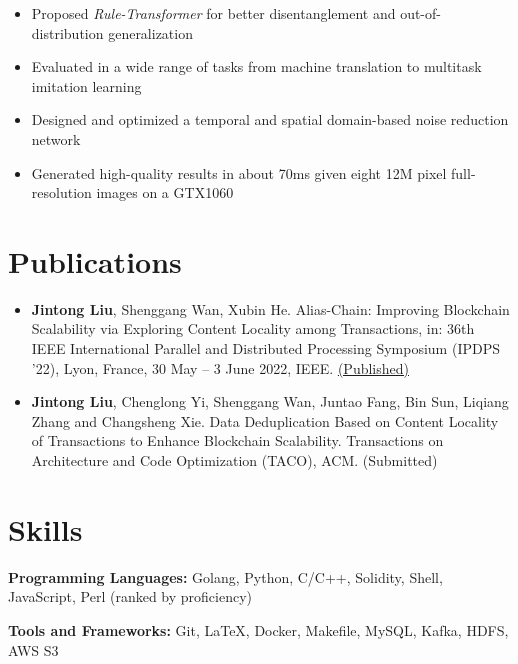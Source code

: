 \documentclass{resume}
\begin{document}
\begin{itemize}
    \item Proposed \textit{Rule-Transformer} for better disentanglement and out-of-distribution generalization
    \item Evaluated in a wide range of tasks from machine translation to multitask imitation learning
\end{itemize}

\begin{itemize}
    \item Designed and optimized a temporal and spatial domain-based noise reduction network
    \item Generated high-quality results in about 70ms given eight 12M pixel full-resolution images on a GTX1060
\end{itemize}

\section{Publications}
\begin{itemize}
    \item \textbf{Jintong Liu}, Shenggang Wan, Xubin He. Alias-Chain: Improving Blockchain Scalability via Exploring Content Locality among Transactions, in: 36th IEEE International Parallel and Distributed Processing Symposium (IPDPS ’22), Lyon, France, 30 May – 3 June 2022, IEEE. \href{https://ieeexplore.ieee.org/document/9820700}{(Published)}
    \item \textbf{Jintong Liu}, Chenglong Yi, Shenggang Wan, Juntao Fang, Bin Sun, Liqiang Zhang and Changsheng Xie. Data Deduplication Based on Content Locality of Transactions to Enhance Blockchain Scalability. Transactions on Architecture and Code Optimization (TACO), ACM. (Submitted)
\end{itemize}

\section{Skills}
\textbf{Programming Languages:} \small Golang, Python, C/C++, Solidity, Shell, JavaScript, Perl (ranked by proficiency)

\textbf{Tools and Frameworks:} \small Git, \LaTeX, Docker, Makefile, MySQL, Kafka, HDFS, AWS S3
\end{document}
